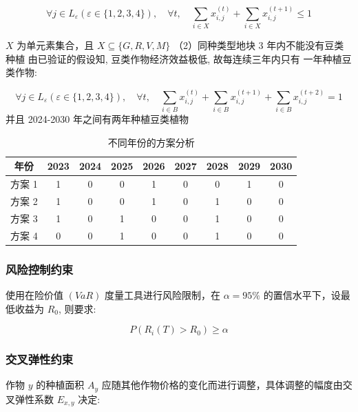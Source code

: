 \documentclass[12pt]{ctexart}
\begin{document}
\begin{equation}
	\forall j \in L_{\varepsilon}(\varepsilon \in\{1,2,3,4\}), \quad \forall t, \quad \sum_{i \in X} x_{i, j}^{(t)}+\sum_{i \in X} x_{i, j}^{(t+1)} \leq 1
\end{equation}
	
	$X$ 为单元素集合，且 $X \subseteq\{G, R, V, M\}$
	（2）同种类型地块 3 年内不能没有豆类种植
	由已验证的假设知, 豆类作物经济效益极低, 故每连续三年内只有
	一年种植豆类作物:
	
\begin{equation}
	\forall j \in L_{\varepsilon}(\varepsilon \in\{1,2,3,4\}), \quad \forall t, \quad \sum_{i \in B} x_{i, j}^{(t)}+\sum_{i \in B} x_{i, j}^{(t+1)}+\sum_{i \in B} x_{i, j}^{(t+2)}=1
\end{equation}
	并且 2024-2030 年之间有两年种植豆类植物

\begin{table}[htbp]
	\centering
	\begin{tabular}{|c|c|c|c|c|c|c|c|c|}
		\hline  
		年份 & 2023 & 2024 & 2025 & 2026 & 2027 & 2028 & 2029 & 2030 \\
		\hline
		方案 1 & 1 & 0 & 0 & 1 & 0 & 0 & 1 & 0 \\
		\hline
		方案 2 & 1 & 0 & 0 & 1 & 0 & 1 & 0 & 0 \\
		\hline
		方案 3 & 1 & 0 & 1 & 0 & 0 & 1 & 0 & 0 \\
		\hline
		方案 4 & 0 & 0 & 1 & 0 & 0 & 1 & 0 & 0 \\
		\hline
	\end{tabular}  
	\caption{不同年份的方案分析}
\end{table}

	
	\subsubsection{风险控制约束}
	
	使用在险价值 $(V a R)$ 度量工具进行风险限制，在 $\alpha=95 \%$ 的置信水平下，设最低收益为 $R_0$, 则要求:
	
\begin{equation}
	P\left(R_i(T)>R_0\right) \geq \alpha
\end{equation}
	
	\subsubsection{交叉弹性约束}
	
	作物 $y$ 的种植面积 $A_y$ 应随其他作物价格的变化而进行调整，具体调整的幅度由交叉弹性系数 $E_{x, y}$ 决定:
	
\end{document}
